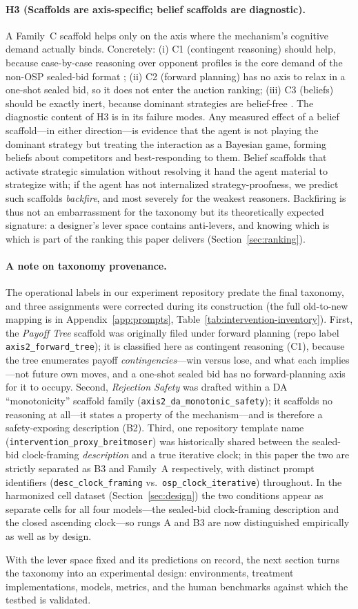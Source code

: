 \paragraph{H3 (Scaffolds are axis-specific; belief scaffolds are diagnostic).}
A Family~C scaffold helps only on the axis where the mechanism's cognitive
demand actually binds. Concretely: (i) C1 (contingent reasoning) should help,
because case-by-case reasoning over opponent profiles is the core
demand of the non-OSP sealed-bid format \citep{li2024designing}; (ii) C2 (forward
planning) has no axis to relax in a one-shot sealed bid, so it does not enter
the auction ranking; (iii) C3 (beliefs) should be exactly inert, because
dominant strategies are belief-free \citep{borgers2019strategically}. The
diagnostic content of H3 is in its failure modes. Any measured effect of a
belief scaffold---in either direction---is evidence that the agent is not
playing the dominant strategy but treating the interaction as a Bayesian game,
forming beliefs about competitors and best-responding to them. Belief scaffolds
that activate strategic simulation without resolving it hand the agent material
to strategize with; if the agent has not internalized strategy-proofness, we
predict such scaffolds \emph{backfire}, and most severely for the weakest
reasoners. Backfiring is thus not an embarrassment for
the taxonomy but its theoretically expected signature: a designer's lever space
contains anti-levers, and knowing which is which is part of the ranking this
paper delivers (Section~\ref{sec:ranking}).

\paragraph{A note on taxonomy provenance.}
The operational labels in our experiment repository predate the final taxonomy,
and three assignments were corrected during its construction (the full
old-to-new mapping is in Appendix~\ref{app:prompts},
Table~\ref{tab:intervention-inventory}). First, the \emph{Payoff Tree} scaffold
was originally filed under forward planning (repo label
\texttt{axis2\_forward\_tree}); it is classified here as contingent reasoning
(C1), because the tree enumerates payoff \emph{contingencies}---win versus
lose, and what each implies---not future own moves, and a one-shot sealed bid
has no forward-planning axis for it to occupy. Second, \emph{Rejection Safety}
was drafted within a DA ``monotonicity'' scaffold family
(\texttt{axis2\_da\_monotonic\_safety}); it scaffolds no reasoning at
all---it states a property of the mechanism---and is therefore a
safety-exposing description (B2). Third, one repository template name
(\texttt{intervention\_proxy\_breitmoser}) was historically shared between the
sealed-bid clock-framing \emph{description} and a true iterative clock; in this
paper the two are strictly separated as B3 and Family~A respectively, with
distinct prompt identifiers (\texttt{desc\_clock\_framing} vs.\
\texttt{osp\_clock\_iterative}) throughout. In the harmonized cell dataset
(Section~\ref{sec:design}) the two conditions appear as separate cells for all
four models---the sealed-bid clock-framing description and the closed
ascending clock---so rungs A and B3 are now distinguished empirically as well
as by design.

With the lever space fixed and its predictions on record, the next section
turns the taxonomy into an experimental design: environments, treatment
implementations, models, metrics, and the human benchmarks against which the
testbed is validated.
